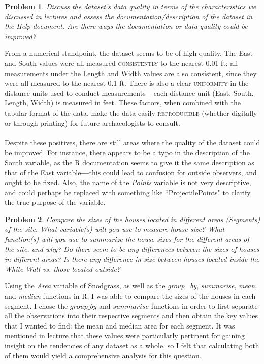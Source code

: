 \documentclass[12pt]{article}
\newtheorem{problem}{Problem}
\begin{document}
\color{black}
 \begin{problem}
     Discuss the dataset’s data quality in terms of the characteristics we discussed in lectures and
assess the documentation/description of the dataset in the Help document. Are there ways the
documentation or data quality could be improved?
 \end{problem}
 \color{nr}
    \indent\indent From a numerical standpoint, the dataset seems to be of high quality. The East and South values were all measured \textsc{consistently} to the nearest 0.01 ft; all measurements under the Length and Width values are also consistent, since they were all measured to the nearest 0.1 ft. There is also a clear \textsc{uniformity} in the distance units used to conduct measurements\textbf{---}each distance unit (East, South, Length, Width) is measured in feet. These factors, when combined with the tabular format of the data, make the data easily \textsc{reproducible} (whether digitally or through printing) for future archaeologists to consult.\\
     \\
     Despite these positives, there are still areas where the quality of the dataset could be improved. For instance, there appears to be a typo in the description of the South variable, as the R documentation seems to give it the same description as that of the East variable\textbf{---}this could lead to confusion for outside observers, and ought to be fixed. Also, the name of the \textit{Points} variable is not very descriptive, and could perhaps be replaced with something like ``ProjectilePoints" to clarify the true purpose of the variable.
     \color{black}
 \begin{problem}
     Compare the sizes of the houses located in different areas (Segments) of the site. What
variable(s) will you use to measure house size? What function(s) will you use to summarize the
house sizes for the different areas of the site, and why? Do there seem to be any differences
between the sizes of houses in different areas? Is there any difference in size between houses
located inside the White Wall vs. those located outside?
 \end{problem}\color{nr}Using the \textit{Area} variable of Snodgrass, as well as the \textit{group\_by}, \textit{summarise}, \textit{mean}, and \textit{median} functions in R, I was able to compare the sizes of the houses in each segment. I chose the $group\_by$ and $summarise$ functions in order to first separate all the observations into their respective segments and then obtain the key values that I wanted to find: the mean and median area for each segment. It was mentioned in lecture that these values were particularly pertinent for gaining insight on the tendencies of any dataset as a whole, so I felt that calculating both of them would yield a comprehensive analysis for this question.\\
\end{document}
